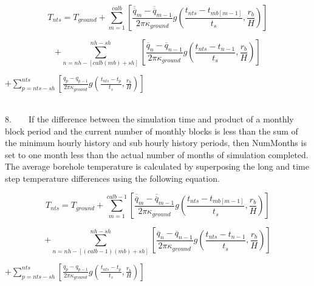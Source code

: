 \begin{equation}
{T_{nts}} = {T_{ground}} + \sum\limits_{m = 1}^{calb} {\left[ {\frac{{{{\overline{\overline q} }_m} - {{\overline{\overline q} }_{m - 1}}}}{{2\pi {\kappa_{ground}}}}g\left( {\frac{{{t_{nts}} - {t_{mb[m - 1]}}}}{{{t_s}}},\frac{{{r_b}}}{H}} \right)} \right]}
\end{equation}

\begin{equation}
+ \sum\limits_{n = nh - [calb(mb) + sh]}^{nh - sh} {\left[ {\frac{{{{\overline q }_n} - {{\overline q }_{n - 1}}}}{{2\pi {\kappa_{ground}}}}g\left( {\frac{{{t_{nts}} - {t_{n - 1}}}}{{{t_s}}},\frac{{{r_b}}}{H}} \right)} \right]}
\end{equation}

\textbf{\(+ \sum\limits_{p = nts - sh}^{nts} {\left[ {\frac{{{q_p} - {q_{p - 1}}}}{{2\pi {\kappa_{ground}}}}g\left( {\frac{{{t_{nts}} - {t_p}}}{{{t_s}}},\frac{{{r_b}}}{H}} \right)} \right]}\) ~~~~~~~~~~~~~~~~~~~~~~~~~~~~~~~~~~~~~~~~~~~~~~~~~~~~~~~}

8.~~~~If the difference between the simulation time and product of a monthly block period and the current number of monthly blocks is less than the sum of the minimum hourly history and sub hourly history periods, then NumMonths is set to one month less than the actual number of months of simulation completed. The average borehole temperature is calculated by superposing the long and time step temperature differences using the following equation.

\begin{equation}
{T_{nts}} = {T_{ground}} + \sum\limits_{m = 1}^{calb - 1} {\left[ {\frac{{{{\overline{\overline q} }_m} - {{\overline{\overline q} }_{m - 1}}}}{{2\pi {\kappa_{ground}}}}g\left( {\frac{{{t_{nts}} - {t_{mb[m - 1]}}}}{{{t_s}}},\frac{{{r_b}}}{H}} \right)} \right]}
\end{equation}

\begin{equation}
+ \sum\limits_{n = nh - [(calb - 1)(mb) + sh]}^{nh - sh} {\left[ {\frac{{{{\overline q }_n} - {{\overline q }_{n - 1}}}}{{2\pi {\kappa_{ground}}}}g\left( {\frac{{{t_{nts}} - {t_{n - 1}}}}{{{t_s}}},\frac{{{r_b}}}{H}} \right)} \right]}
\end{equation}

\textbf{\(+ \sum\limits_{p = nts - sh}^{nts} {\left[ {\frac{{{q_p} - {q_{p - 1}}}}{{2\pi {\kappa_{ground}}}}g\left( {\frac{{{t_{nts}} - {t_p}}}{{{t_s}}},\frac{{{r_b}}}{H}} \right)} \right]}\) ~~~~~~~~~~~~~~~~~~~~~~~~~~}

